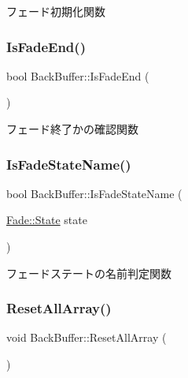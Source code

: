 フェード初期化関数 

\mbox{\label{class_back_buffer_aab8b2f4a0fdbadccdd9413c12830a377}} 
\subsubsection{\texorpdfstring{Is\+Fade\+End()}{IsFadeEnd()}}
{\footnotesize\ttfamily bool Back\+Buffer\+::\+Is\+Fade\+End (\begin{DoxyParamCaption}{ }\end{DoxyParamCaption})\hspace{0.3cm}{\ttfamily [inline]}}



フェード終了かの確認関数 

\mbox{\label{class_back_buffer_a1c13a0de1f95b8f2fea929e9306d426a}} 
\subsubsection{\texorpdfstring{Is\+Fade\+State\+Name()}{IsFadeStateName()}}
{\footnotesize\ttfamily bool Back\+Buffer\+::\+Is\+Fade\+State\+Name (\begin{DoxyParamCaption}\item[{\mbox{\hyperlink{class_fade_ae77826bf3ff2ab95fb7b3b6f95cba80a}{Fade\+::\+State}}}]{state }\end{DoxyParamCaption})\hspace{0.3cm}{\ttfamily [inline]}}



フェードステートの名前判定関数 

\mbox{\label{class_back_buffer_a04e942576ac5de94d16764d347111234}} 
\subsubsection{\texorpdfstring{Reset\+All\+Array()}{ResetAllArray()}}
{\footnotesize\ttfamily void Back\+Buffer\+::\+Reset\+All\+Array (\begin{DoxyParamCaption}{ }\end{DoxyParamCaption})}




